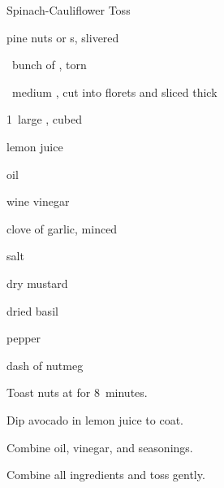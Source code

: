 \begin{recipe}{Spinach-Cauliflower Toss}{}{}

\begin{ingredients}
\item \C{\half} pine nuts or s, slivered
\item \half~bunch of , torn
\item \half~medium , cut into florets and sliced \inch{1\quarter} thick
\item 1~large , cubed
\item lemon juice
\item {} oil
\item {} wine vinegar
\item clove of garlic, minced
\item \tp{\half} salt
\item \tp{\half} dry mustard
\item \tp{\half} dried basil
\item \tp{\quarter} pepper
\item dash of nutmeg
\end{ingredients}

\begin{directions}
\item Toast nuts at  for 8~minutes.
\item Dip avocado in lemon juice to coat.
\item Combine oil, vinegar, and seasonings.
\item Combine all ingredients and toss gently.
\end{directions}

\end{recipe}

